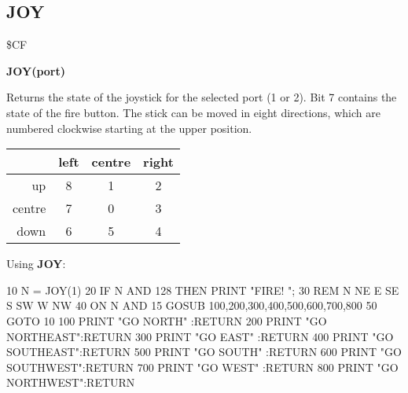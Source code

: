 \subsection{JOY}
\begin{description}[leftmargin=3cm,style=nextline]
\item [Token:] \$CF
\item [Format:] {\bf JOY(port)}
\item [Usage:] Returns the state of the
               joystick for the selected port (1 or 2).
               Bit 7 contains the state of the fire button.
               The stick can be moved in eight directions, which
               are numbered clockwise starting at the upper position.

\ttfamily
{\setlength{\tabcolsep}{1mm}
\begin{tabular}{|r|c|c|c|}
\hline
&  left  & centre & right \\
\hline
up     &  8 &    1  & 2 \\
centre &  7 &    0  & 3 \\
down   &  6 &    5  & 4 \\
\hline
\end{tabular}
}

\item [Example:] Using {\bf JOY}:
\begin{screenoutput}
 10 N = JOY(1)
 20 IF N AND 128 THEN PRINT "FIRE! ";
 30 REM                N   NE  E   SE  S   SW  W   NW
 40 ON N AND 15 GOSUB 100,200,300,400,500,600,700,800
 50 GOTO 10
100 PRINT "GO NORTH"    :RETURN
200 PRINT "GO NORTHEAST":RETURN
300 PRINT "GO EAST"     :RETURN
400 PRINT "GO SOUTHEAST":RETURN
500 PRINT "GO SOUTH"    :RETURN
600 PRINT "GO SOUTHWEST":RETURN
700 PRINT "GO WEST"     :RETURN
800 PRINT "GO NORTHWEST":RETURN
\end{screenoutput}
\end{description}


\newpage
